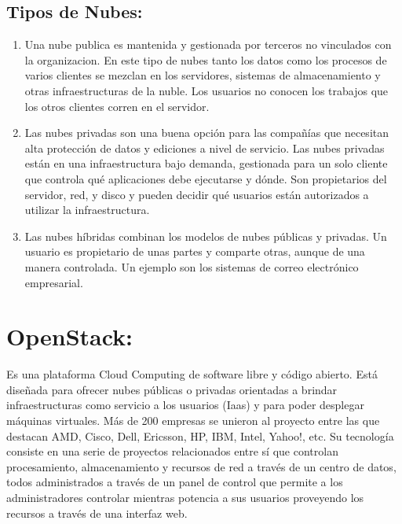 \documentclass[12pt,letterpaper]{article}
\begin{document}
\subsection{Tipos de Nubes:}
	\begin{enumerate}

\item Una nube publica es mantenida y gestionada por terceros no vinculados con la organizacion. En este tipo de nubes tanto los datos como los procesos de varios clientes se mezclan en los servidores, sistemas de almacenamiento y otras infraestructuras de la nuble. Los usuarios no conocen los trabajos que los otros clientes corren en el servidor.
\item Las nubes privadas son una buena opción para las compañías que necesitan alta protección de datos y ediciones a nivel de servicio. Las nubes privadas están en una infraestructura bajo demanda, gestionada para un solo cliente que controla qué aplicaciones debe ejecutarse y dónde. Son propietarios del servidor, red, y disco y pueden decidir qué usuarios están autorizados a utilizar la infraestructura.
\item Las nubes híbridas combinan los modelos de nubes públicas y privadas. Un usuario es propietario de unas partes y comparte otras, aunque de una manera controlada. Un ejemplo son los sistemas de correo electrónico empresarial.
		\end{enumerate}	
		
		
\section {OpenStack:}
Es una plataforma Cloud Computing de software libre y código abierto. Está 
diseñada para ofrecer nubes públicas o privadas orientadas a brindar infraestructuras
 como servicio a los usuarios (Iaas) y para poder desplegar máquinas virtuales. 
Más de 200 empresas se unieron al proyecto entre las que destacan AMD, Cisco, Dell,
 Ericsson, HP, IBM, Intel, Yahoo!, etc.
Su tecnología consiste en una serie de proyectos relacionados entre sí que controlan
 procesamiento, almacenamiento y recursos de red a través de un centro de datos, todos
 administrados a través de un panel de control que permite a los administradores 
controlar mientras potencia a sus usuarios proveyendo los recursos a través de una 
interfaz web.
\end{document}

